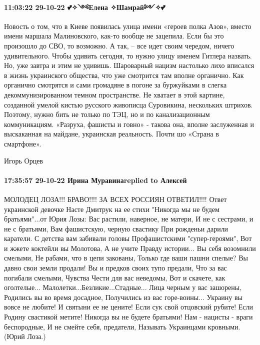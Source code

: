\paragraph{11:03:22 29-10-22 💕✧༺Елена ✧Шамрай༻✧💕}

Новость о том, что в Киеве появилась улица имени «героев полка Азов», вместо
имени маршала Малиновского, как-то вообще не зацепила. Если бы это произошло до
СВО, то возможно. А так, – все идет своим чередом, ничего удивительного. Чтобы
удивить сегодня, то нужно улицу именем Гитлера назвать. Но, уже завтра и этим
не удивишь. Шароварный нацизм настолько лихо вписался в жизнь украинского
общества, что уже смотрится там вполне органично. Как органично смотрятся и
сами громадяне в погоне за буржуйками в слегка декоммунизированном темном
пространстве. Не хватает в этой картине, созданной умелой кистью русского
живописца Суровикина, нескольких штрихов. Поэтому, нужно бить не только по ТЭЦ,
но и по канализационным коммуникациям. «Разруха, фашисты и говно» - такова она,
вполне заслуженная и выскаканная на майдане, украинская реальность. Почти шо
«Страна в смартфоне».

Игорь Орцев

\paragraph{17:35:57 29-10-22 Ирина Муравинаreplied to Алексей}

МОЛОДЕЦ ЛОЗА!!! БРАВО!!!! ЗА ВСЕХ РОССИЯН ОТВЕТИЛ!!!! Ответ украинской девочке
Насте Дмитрук на ее стихи "Никогда мы не будем братьями"...от Юрия Лозы: Вас
растили, наверное, не матери, И не с сестрами, и не с братьями, Вам фашистскую,
черную свастику При рожденьи дарили каратели. С детства вам забивали головы
Профашистскими "супер-героями", Вот и жжете коктейли вы Молотова, А не учите
Правду истории... Вы себя возомнили смелыми, Не рабами, что в цепи закованы,
Только где ваши пашни спелые? Вы давно свои земли продали! Вы и предков своих
тупо предали, Что за вас погибали смелыми, Чувства Чести для вас неведомы, Вот
и скачете, как оголтелые... Малолетки...Безликие...Стадные... Лица черным у вас
зашорены, Родились вы во время досадное, Получились из вас горе-воины...
Украину вы вовсе не любите! И святыни ее не цените! Если сук свой отцовский
рубите! Если Родину свастикой метите! Никогда вы не будете братьями! Нам -
нацисты - враги беспородные, И не смейте себя, предатели, Называть Украинцами
кровными. (Юрий Лоза.)

